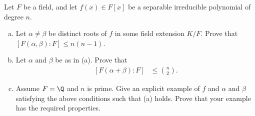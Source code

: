 \documentclass[10pt]{mypackage}
\begin{document}
\begin{problem}[Problem 8]
  Let $F$ be a field, and let $f(x)\in F[x]$ be a separable irreducible polynomial of degree $n$.
  \begin{enumerate}[(a)]
    \item Let $\alpha\neq \beta$ be distinct roots of $f$ in some field extension $K/F$. Prove that $\left[ F\left( \alpha,\beta \right):F \right] \leq n\left( n-1 \right)$.
    \item Let $\alpha$ and $\beta$ be as in (a). Prove that
      \begin{align*}
        \left[ F\left( \alpha + \beta \right) : F \right] &\leq {n\choose 2}.
      \end{align*}
    \item Assume $F = \Q$ and $n$ is prime. Give an explicit example of $f$ and $\alpha$ and $\beta$ satisfying the above conditions such that (a) holds. Prove that your example has the required properties.
  \end{enumerate}
\end{problem}
\end{document}
